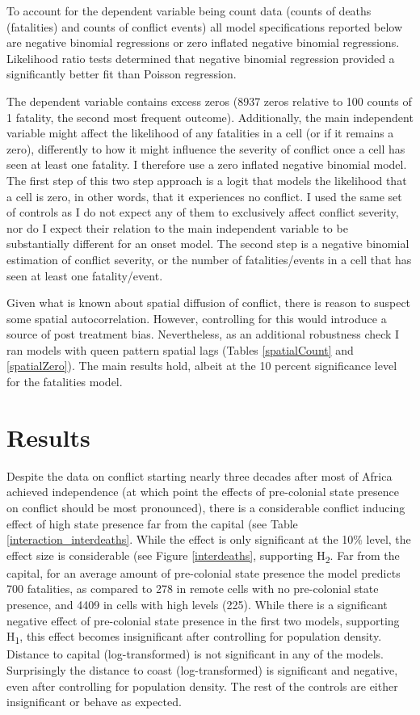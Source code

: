 To account for the dependent variable being count data (counts of deaths
(fatalities) and counts of conflict events) all model specifications reported
below are negative binomial regressions or zero inflated negative binomial
regressions. Likelihood ratio tests determined that negative binomial regression
provided a significantly better fit than Poisson regression.

The dependent variable contains excess zeros (8937 zeros relative to 100 counts
of 1 fatality, the second most frequent outcome). Additionally, the main
independent variable might affect the likelihood of any fatalities in a cell (or
if it remains a zero), differently to how it might influence the severity of
conflict once a cell has seen at least one fatality. I therefore use a zero
inflated negative binomial model. The first step of this two step approach is a
logit that models the likelihood that a cell is zero, in other words, that it
experiences no conflict. I used the same set of controls as I do not expect any
of them to exclusively affect conflict severity, nor do I expect their relation
to the main independent variable to be substantially different for an onset
model. The second step is a negative binomial estimation of conflict severity,
or the number of fatalities/events in a cell that has seen at least one
fatality/event.

Given what is known about spatial diffusion of conflict, there is reason to
suspect some spatial autocorrelation. However, controlling for this would
introduce a source of post treatment bias. Nevertheless, as an additional
robustness check I ran models with queen pattern spatial lags (Tables
\ref{spatialCount} and \ref{spatialZero}). The main results hold, albeit at the
10 percent significance level for the fatalities model.

\section{Results} \label{Results}

Despite the data on conflict starting nearly three decades after most of Africa
achieved independence (at which point the effects of pre-colonial state presence
on conflict should be most pronounced), there is a considerable conflict
inducing effect of high state presence far from the capital (see Table
\ref{interaction_interdeaths}. While the effect is only significant at the 10\%
level, the effect size is considerable (see Figure \ref{interdeaths}, supporting
H\textsubscript{2}. Far from the capital, for an average amount of pre-colonial state
presence the model predicts 700 fatalities, as compared to 278 in remote cells
with no pre-colonial state presence, and 4409 in cells with high levels (225).
While there is a significant negative effect of pre-colonial state presence in
the first two models, supporting H\textsubscript{1}, this effect becomes
insignificant after controlling for population density. Distance to capital
(log-transformed) is not significant in any of the models. Surprisingly the
distance to coast (log-transformed) is significant and negative, even after
controlling for population density. The rest of the controls are either
insignificant or behave as expected.

